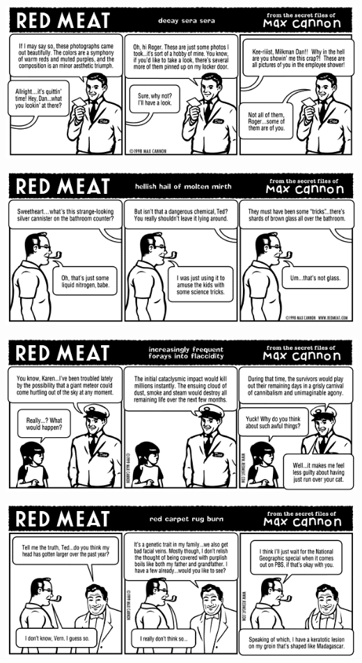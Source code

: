\documentclass[a4paper,twoside,11pt]{article}
\begin{document}
\includegraphics[width=\textwidth]{redmeat_1999-03-15.png}



\includegraphics[width=\textwidth]{redmeat_1999-03-22.png}



\includegraphics[width=\textwidth]{redmeat_1999-03-29.png}



\includegraphics[width=\textwidth]{redmeat_1999-04-05.png}
\end{document}
